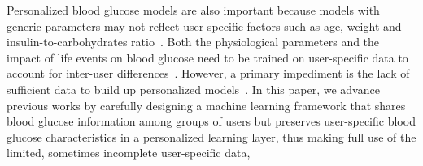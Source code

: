 Personalized blood glucose models are also important because models with generic parameters may not reflect user-specific factors such as age, weight and insulin-to-carbohydrates ratio~\cite{bib:IJNMBE16:Oviedo}.
Both the physiological parameters and the impact of life events on blood glucose need to be trained on user-specific data to account for inter-user differences~\cite{bib:ICMLA13:Bunescu}.
However, a primary impediment is the lack of sufficient data to build up personalized models~\cite{bib:KDHealth16:Marling}.
In this paper, we advance previous works by carefully designing a machine learning framework that shares blood glucose information among groups of users but preserves user-specific blood glucose characteristics in a personalized learning layer, thus making full use of the limited, sometimes incomplete user-specific data,


